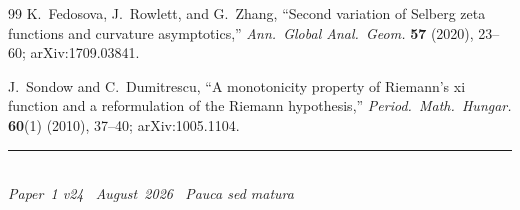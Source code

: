 \documentclass[11pt]{article}
\begin{document}
\begin{thebibliography}{99}
K.~Fedosova, J.~Rowlett, and G.~Zhang,
``Second variation of Selberg zeta functions and
curvature asymptotics,''
\emph{Ann.\ Global Anal.\ Geom.} \textbf{57} (2020),
23--60; arXiv:1709.03841.

J.~Sondow and C.~Dumitrescu,
``A monotonicity property of Riemann's xi function
and a reformulation of the Riemann hypothesis,''
\emph{Period.\ Math.\ Hungar.} \textbf{60}(1) (2010),
37--40; arXiv:1005.1104.

\end{thebibliography}

\enlargethispage{3\baselineskip}
\vspace*{\fill}
\begin{minipage}{\linewidth}
\rule{\linewidth}{0.4pt}\smallskip\\
\small\emph{Paper~1 v24 \textperiodcentered\ August~2026
\textperiodcentered\ Pauca sed matura}
\end{minipage}
\end{document}
